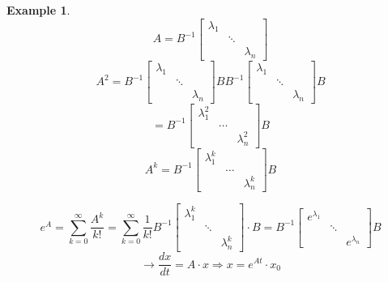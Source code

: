\documentclass[a4paper,landscape,twocolumn]{article}
\theoremstyle{definition}
\newtheorem{ex}{Example}
\begin{document}
\begin{ex}
  \label{anwendung-10.17}
  \[ A = B^{-1} \begin{bmatrix} \lambda_1 &  & \\ & \ddots & \\ & & \lambda_n \end{bmatrix} \]
  \[
    A^2
      = B^{-1} \begin{bmatrix} \lambda_1 & & \\ & \ddots & \\ & & \lambda_n \end{bmatrix}
      B B^{-1} \begin{bmatrix} \lambda_1 & & \\ & \ddots & \\ & & \lambda_n \end{bmatrix} B
  \] \[
    = B^{-1} \begin{bmatrix} \lambda_1^2 & & \\ & \dots & \\ & & \lambda_n^2 \end{bmatrix} B
  \] \[
    A^k = B^{-1} \begin{bmatrix} \lambda_1^k & & \\ & \dots & \\ & & \lambda_n^k \end{bmatrix} B
  \]

  \[
    e^A
      = \sum_{k=0}^\infty \frac{A^k}{k!}
      = \sum_{k=0}^\infty \frac{1}{k!} B^{-1} \begin{bmatrix} \lambda_1^k & & \\ & \ddots & \\ & & \lambda_n^k \end{bmatrix} \cdot B
      = B^{-1} \begin{bmatrix} e^{\lambda_1} & & \\ & \ddots & \\ & & e^{\lambda_n} \end{bmatrix} B
  \] \[
    \rightarrow
    \frac{dx}{dt} = A \cdot x \Rightarrow x = e^{A t} \cdot x_0
  \]
\end{ex}
\end{document}
